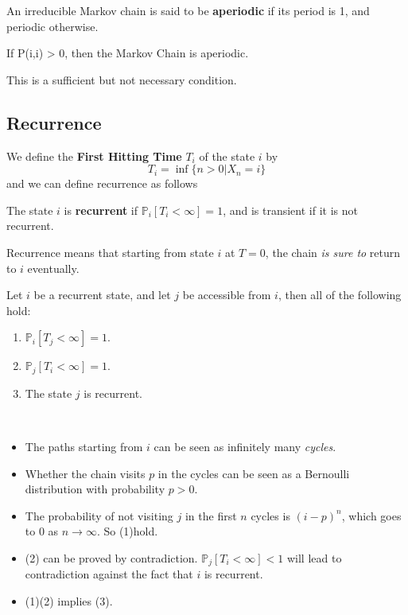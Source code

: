 \begin{definition}[Aperiodicity]
    An irreducible Markov chain is said to be \textbf{aperiodic} if its period is 1, and periodic otherwise.
\end{definition}

\begin{lemma}
    \normalfont
    If P(i,i) > 0, then the Markov Chain is aperiodic.
\end{lemma}
\begin{remark}
    This is a sufficient but not necessary condition.
\end{remark}


\subsection{Recurrence}
We define the \textbf{First Hitting Time} $T_i$ of the state $i$ by
\[ T_i = \inf\{n>0 | X_n = i\} \]
and we can define recurrence as follows
\begin{definition}[Recurrence]
    The state $i$ is \textbf{recurrent} if $\mathbb{P}_i[T_i<\infty] = 1$, and is transient if it is not recurrent.
\end{definition}
\begin{remark}
    Recurrence means that starting from state $i$ at $T=0$, the chain \emph{is sure to} return to $i$ eventually.
\end{remark}

\begin{theorem}
    \normalfont
    Let $i$ be a recurrent state, and let $j$ be accessible from $i$, then all of the following hold:
    \begin{enumerate}
        \item $\mathbb{P}_i[T_j < \infty] = 1$.
        \item $\mathbb{P}_j[T_i < \infty] = 1$.
        \item The state $j$ is recurrent.
    \end{enumerate}
\end{theorem}
\begin{sketchproof}
    ~{}
    \begin{itemize}
        \item The paths starting from $i$ can be seen as infinitely many \emph{cycles}.
        \item Whether the chain visits $p$ in the cycles can be seen as a Bernoulli distribution with probability $p>0$.
        \item The probability of not visiting $j$ in the first $n$ cycles is $(i-p)^n$, which goes to $0$ as $n\to\infty$. So (1)hold.
        \item (2) can be proved by contradiction. $\mathbb{P}_j[T_i < \infty] < 1$ will lead to contradiction against the fact that $i$ is recurrent.
        \item (1)(2) implies (3).
    \end{itemize}
\end{sketchproof}

